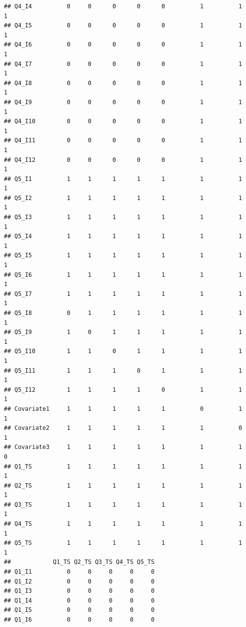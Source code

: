 \documentclass[
]{book}
\begin{document}
\begin{verbatim}
## Q4_I4          0     0      0      0      0          1          1          1
## Q4_I5          0     0      0      0      0          1          1          1
## Q4_I6          0     0      0      0      0          1          1          1
## Q4_I7          0     0      0      0      0          1          1          1
## Q4_I8          0     0      0      0      0          1          1          1
## Q4_I9          0     0      0      0      0          1          1          1
## Q4_I10         0     0      0      0      0          1          1          1
## Q4_I11         0     0      0      0      0          1          1          1
## Q4_I12         0     0      0      0      0          1          1          1
## Q5_I1          1     1      1      1      1          1          1          1
## Q5_I2          1     1      1      1      1          1          1          1
## Q5_I3          1     1      1      1      1          1          1          1
## Q5_I4          1     1      1      1      1          1          1          1
## Q5_I5          1     1      1      1      1          1          1          1
## Q5_I6          1     1      1      1      1          1          1          1
## Q5_I7          1     1      1      1      1          1          1          1
## Q5_I8          0     1      1      1      1          1          1          1
## Q5_I9          1     0      1      1      1          1          1          1
## Q5_I10         1     1      0      1      1          1          1          1
## Q5_I11         1     1      1      0      1          1          1          1
## Q5_I12         1     1      1      1      0          1          1          1
## Covariate1     1     1      1      1      1          0          1          1
## Covariate2     1     1      1      1      1          1          0          1
## Covariate3     1     1      1      1      1          1          1          0
## Q1_TS          1     1      1      1      1          1          1          1
## Q2_TS          1     1      1      1      1          1          1          1
## Q3_TS          1     1      1      1      1          1          1          1
## Q4_TS          1     1      1      1      1          1          1          1
## Q5_TS          1     1      1      1      1          1          1          1
##            Q1_TS Q2_TS Q3_TS Q4_TS Q5_TS
## Q1_I1          0     0     0     0     0
## Q1_I2          0     0     0     0     0
## Q1_I3          0     0     0     0     0
## Q1_I4          0     0     0     0     0
## Q1_I5          0     0     0     0     0
## Q1_I6          0     0     0     0     0

\end{verbatim}
\end{document}
